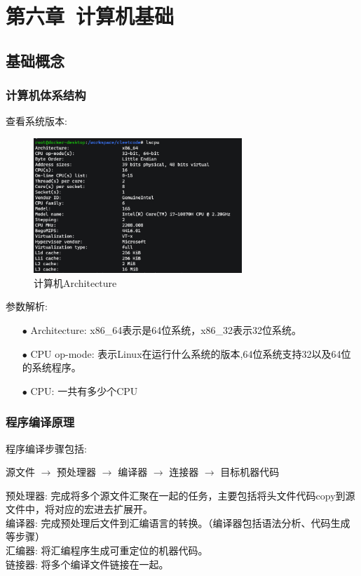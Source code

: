 \documentclass[12pt]{book}
\begin{document}
\newpage

\fancyhead{}

\chapter{第六章\ 计算机基础}
\section{基础概念}
\subsection{计算机体系结构}
查看系统版本:
\begin{figure}[H]
	\centering
	\includegraphics[width=0.7\textwidth]{images/cpu_architecture.png}
	\caption{计算机Architecture}
	\label{cpu-architecture}
\end{figure}
参数解析:\newline
\begin{itemize}
\item[$\bullet$] Architecture: x86\_64表示是64位系统，x86\_32表示32位系统。
\item[$\bullet$] CPU op-mode: 表示Linux在运行什么系统的版本,64位系统支持32以及64位的系统程序。
\item[$\bullet$] CPU: 一共有多少个CPU
\end{itemize}

\subsection{程序编译原理}
程序编译步骤包括:
 \begin{center} 源文件 $\rightarrow$ 预处理器 $\rightarrow$ 编译器 $\rightarrow$ 连接器 $\rightarrow$ 目标机器代码 \end{center}
预处理器: 完成将多个源文件汇聚在一起的任务，主要包括将头文件代码copy到源文件中，将对应的宏进去扩展开。\\
编译器: 完成预处理后文件到汇编语言的转换。（编译器包括语法分析、代码生成等步骤）\\
汇编器: 将汇编程序生成可重定位的机器代码。\\
链接器: 将多个编译文件链接在一起。\\
\end{document}
